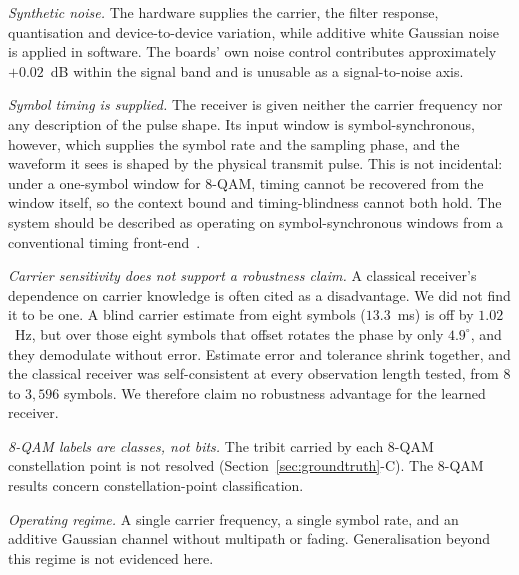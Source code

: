 \documentclass{ieeeaccess}
\begin{document}
\emph{Synthetic noise.} The hardware supplies the carrier, the filter
response, quantisation and device-to-device variation, while additive white
Gaussian noise is applied in software. The boards' own noise control contributes
approximately $+0.02$~dB within the signal band and is unusable as a
signal-to-noise axis.

\emph{Symbol timing is supplied.} The receiver is given neither the carrier
frequency nor any description of the pulse shape. Its input window is
symbol-synchronous, however, which supplies the symbol rate and the sampling
phase, and the waveform it sees is shaped by the physical transmit pulse. This is not incidental: under a
one-symbol window for 8-QAM, timing cannot be recovered from the window
itself, so the context bound and timing-blindness cannot both hold. The system
should be described as operating on symbol-synchronous windows from a
conventional timing front-end~\cite{gardner1986ted}.

\emph{Carrier sensitivity does not support a robustness claim.} A classical
receiver's dependence on carrier knowledge is often cited as a disadvantage. We
did not find it to be one. A blind carrier estimate from eight symbols
($13.3$~ms) is off by $1.02$~Hz, but over those eight symbols that offset
rotates the phase by only $4.9^{\circ}$, and they demodulate without error.
Estimate error and tolerance shrink together, and the classical receiver was
self-consistent at every observation length tested, from 8 to $3{,}596$
symbols. We therefore claim no robustness advantage for the learned receiver.

\emph{8-QAM labels are classes, not bits.} The tribit carried by each 8-QAM
constellation point is not resolved (Section~\ref{sec:groundtruth}-C). The
8-QAM results concern constellation-point classification.

\emph{Operating regime.} A single carrier frequency, a single symbol rate, and
an additive Gaussian channel without multipath or fading. Generalisation beyond
this regime is not evidenced here.

\end{document}
